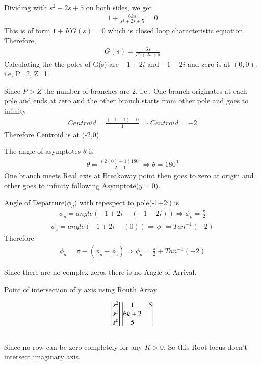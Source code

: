 \begin{enumerate}[label=\thesection.\arabic*.,ref=\thesection.\theenumi]
Dividing with $s^2 + 2s + 5$ on both sides, we get
\begin{align}
    1+\frac{6 k s}{s^{2}+2 s+5}=0    
\end{align}
This is of form $1+KG(s)=0$ which is closed loop characteristic equation. Therefore,
\begin{align}
G(s) = \frac{6 s}{s^{2}+2 s+5}
\end{align}
Calculating the the poles of G(s) are $-1+2i$ and $-1-2i$ and zero is at $(0,0)$. i.e, P=2, Z=1.

Since $P>Z$ the number of branches are 2. i.e., One branch originates at each pole and ends at zero and the other branch starts from other pole and goes to infinity.
\begin{align}
Centroid = \frac{(-1-1)-0}{1} \Rightarrow Centroid= -2
\end{align}
 Therefore Centroid is at (-2,0)

The angle of asymptotes $\theta$ is
\begin{align}
\theta=\frac{(2(0)+1) 180^{0}}{2-1} \Rightarrow \theta = 180^{0}
\end{align}
One branch meets Real axis at Breakaway point then goes to zero at origin and other goes to infinity following Asymptote($y=0$).

Angle of Departure($\phi_{d}$) with repespect to pole(-1+2i) is
\begin{align}
\phi_{p} = angle(-1+2i-(-1-2i))\Rightarrow \phi_{p}= \frac{\pi}{2}
\end{align}
\begin{align}
\phi_{z} = angle(-1+2i-(0))\Rightarrow \phi_{z}= Tan^{-1}(-2) 
\end{align}
Therefore
\begin{align}
\phi_{d} = \pi - (\phi_{p} - \phi_{z}) \Rightarrow \phi_{d} = \frac{\pi}{2} + Tan^{-1}(-2)
\end{align}

Since there are no complex zeros there is no Angle of Arrival.

Point of intersection of y axis using Routh Array

 \begin{align}
\begin{vmatrix}s^2\\s^1\\s^0\end{vmatrix}
\begin{vmatrix}1 & 5 \\ 6k+2 \\ 5\end{vmatrix}
\end{align}\\
Since no row can be zero completely for any $K>0$, So this Root locus doen't intersect imaginary axis.





\end{enumerate}

